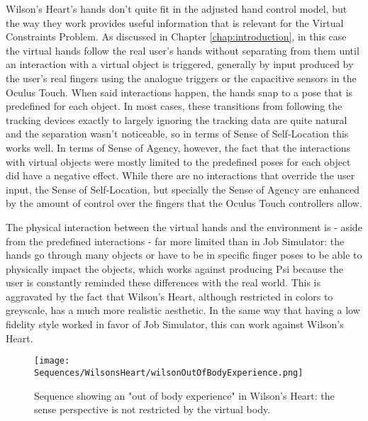 Wilson's Heart's hands don't quite fit in the adjusted hand control model, but the way they work provides useful information that is relevant for the Virtual Constraints Problem. As discussed in Chapter \ref{chap:introduction}, in this case the virtual hands follow the real user's hands without separating from them until an interaction with a virtual object is triggered, generally by input produced by the user's real fingers using the analogue triggers or the capacitive sensors in the Oculus Touch. When said interactions happen, the hands snap to a pose that is predefined for each object. In most cases, these transitions from following the tracking devices exactly to largely ignoring the tracking data are quite natural and the separation wasn't noticeable, so in terms of Sense of Self-Location this works well. In terms of Sense of Agency, however, the fact that the interactions with virtual objects were mostly limited to the predefined poses for each object did have a negative effect. While there are no interactions that override the user input, the Sense of Self-Location, but specially the Sense of Agency are enhanced by the amount of control over the fingers that the Oculus Touch controllers allow.

The physical interaction between the virtual hands and the environment is - aside from the predefined interactions - far more limited than in Job Simulator: the hands go through many objects or have to be in specific finger poses to be able to physically impact the objects, which works against producing Psi because the user is constantly reminded these differences with the real world. This is aggravated by the fact that Wilson's Heart, although restricted in colors to greyscale, has a much more realistic aesthetic. In the same way that having a low fidelity style worked in favor of Job Simulator, this can work against Wilson's Heart.

\begin{figure}[h]
\centering
\texttt{[image: Sequences/WilsonsHeart/wilsonOutOfBodyExperience.png]}
\caption{Sequence showing an "out of body experience" in Wilson's Heart: the sense perspective is not restricted by the virtual body.}
\label{fig:wilsonPenetration}
\end{figure}

